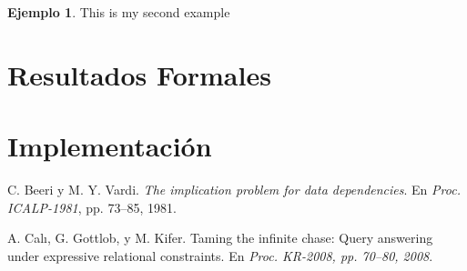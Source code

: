 \documentclass[11pt,a4paper,twoside]{tesis}
\theoremstyle{definition}
\newtheorem{exmp}{Ejemplo}
\begin{document}
    
\begin{exmp}
This is my second example
\end{exmp}


\chapter{Resultados Formales}
\chapter{Implementación}

\backmatter
\begin{thebibliography}{9}
    C. Beeri y M. Y. Vardi.
    \textit{The implication problem for data dependencies}. 
    En \textit{Proc. ICALP-1981}, pp. 73–85, 1981.
     
    A. Calı, G. Gottlob, y M. Kifer.
    Taming the infinite chase: Query answering under expressive relational constraints.
    En \textit{Proc. KR-2008, pp. 70–80, 2008}. 

    \end{thebibliography}
\end{document}
